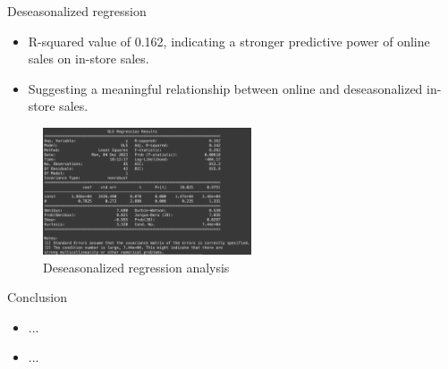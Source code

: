 \documentclass{beamer}
\begin{document}
\begin{frame}{Deseasonalized regression}
\begin{itemize}
    \item R-squared value of 0.162, indicating a stronger predictive power of online sales on in-store sales. 
    \item Suggesting a meaningful relationship between online and deseasonalized in-store sales.
  
\end{itemize}


\begin{figure}
    \centering
    \includegraphics[width=0.55\textwidth]{Deseasonalized regression.png}
    \caption{Deseasonalized regression analysis}
    \end{figure}


\end{frame}


\begin{frame}{Conclusion}
\begin{itemize}
    \item ...
    \item ...
\end{itemize}




\end{frame}
\end{document}
